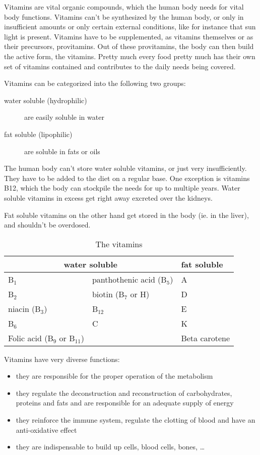 \documentclass[../main.tex]{subfiles}
\begin{document}
\label{tab:vitamins}
Vitamins are vital organic compounds, which the human body needs for vital body functions.
Vitamins can't be synthesized by the human body, or only in insufficient amounts or only certain external conditions,
like for instance that sun light is present.
Vitamins have to be supplemented, as vitamins themselves or as their precursors, provitamins.
Out of these provitamins, the body can then build the active form, the vitamins.
Pretty much every food pretty much has their own set of vitamins contained and contributes to the daily needs being covered.

Vitamins can be categorized into the following two groups:
\begin{description}
\item[water soluble (hydrophilic)] are easily soluble in water
  \item[fat soluble (lipophilic)] are soluble in fats or oils
  \end{description}

  The human body can't store water soluble vitamins, or just very insufficiently.
  They have to be added to the diet on a regular base.
  One exception is vitamins B12, which the body can stockpile the needs for up to multiple years.
  Water soluble vitamins in excess get right away excreted over the kidneys.

  Fat soluble vitamins on the other hand get stored in the body (ie. in the liver), and shouldn't be overdosed.

  \begin{table}[htb!]
    \centering
    \begin{tabular}[t]{ll|l}
      \multicolumn{2}{c}{\textbf{water soluble}} & \textbf{fat soluble} \\
      \hline
      B$_1$ & panthothenic acid (B$_5$) & A \\
      B$_2$ & biotin (B$_7$ or H) & D \\
      niacin (B$_3$) & B$_{12}$ & E \\
      B$_6$ & C & K \\
      Folic acid (B$_9$ or B$_{11}$) & & Beta carotene\\
    \end{tabular}
    \caption{The vitamins}
  \end{table}

  Vitamins have very diverse functions:
  \begin{itemize}
  \item they are responsible for the proper operation of the metabolism
  \item they regulate the deconstruction and reconstruction of carbohydrates, proteins and fats and are responsible for an adequate supply of energy
  \item they reinforce the immune system, regulate the clotting of blood and have an anti-oxidative effect
    \item they are indispensable to build up cells, blood cells, bones, \ldots
    \end{itemize}
\end{document}
